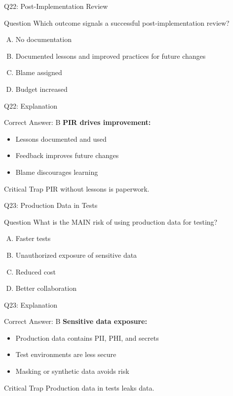 \documentclass{beamer}
\begin{document}
	\begin{frame}{Q22: Post-Implementation Review}
		\begin{block}{Question}
			Which outcome signals a successful post-implementation review?
		\end{block}
		\begin{enumerate}[(A)]
			\item No documentation
			\item Documented lessons and improved practices for future changes
			\item Blame assigned
			\item Budget increased
		\end{enumerate}
	\end{frame}
	
	\begin{frame}{Q22: Explanation}
		\begin{block}{Correct Answer: B}
			\textbf{PIR drives improvement:}
			\begin{itemize}
				\item Lessons documented and used
				\item Feedback improves future changes
				\item Blame discourages learning
			\end{itemize}
		\end{block}
		\begin{alertblock}{Critical Trap}
			PIR without lessons is paperwork.
		\end{alertblock}
	\end{frame}
	
	\begin{frame}{Q23: Production Data in Tests}
		\begin{block}{Question}
			What is the MAIN risk of using production data for testing?
		\end{block}
		\begin{enumerate}[(A)]
			\item Faster tests
			\item Unauthorized exposure of sensitive data
			\item Reduced cost
			\item Better collaboration
		\end{enumerate}
	\end{frame}
	
	\begin{frame}{Q23: Explanation}
		\begin{block}{Correct Answer: B}
			\textbf{Sensitive data exposure:}
			\begin{itemize}
				\item Production data contains PII, PHI, and secrets
				\item Test environments are less secure
				\item Masking or synthetic data avoids risk
			\end{itemize}
		\end{block}
		\begin{alertblock}{Critical Trap}
			Production data in tests leaks data.
		\end{alertblock}
	\end{frame}
	
\end{document}
